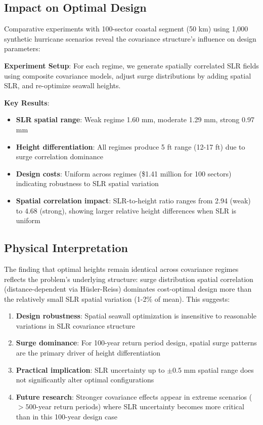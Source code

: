\documentclass[review]{elsarticle}
\begin{document}
\subsection{Impact on Optimal Design}

Comparative experiments with 100-sector coastal segment (50 km) using 1,000 synthetic hurricane scenarios reveal the covariance structure's influence on design parameters:

\textbf{Experiment Setup}:
For each regime, we generate spatially correlated SLR fields using composite covariance models, adjust surge distributions by adding spatial SLR, and re-optimize seawall heights.

\textbf{Key Results}:
\begin{itemize}
\item \textbf{SLR spatial range}: Weak regime 1.60 mm, moderate 1.29 mm, strong 0.97 mm
\item \textbf{Height differentiation}: All regimes produce 5 ft range (12-17 ft) due to surge correlation dominance
\item \textbf{Design costs}: Uniform across regimes (\$1.41 million for 100 sectors) indicating robustness to SLR spatial variation
\item \textbf{Spatial correlation impact}: SLR-to-height ratio ranges from 2.94 (weak) to 4.68 (strong), showing larger relative height differences when SLR is uniform
\end{itemize}

\subsection{Physical Interpretation}

The finding that optimal heights remain identical across covariance regimes reflects the problem's underlying structure: surge distribution spatial correlation (distance-dependent via Hüsler-Reiss) dominates cost-optimal design more than the relatively small SLR spatial variation (1-2\% of mean). This suggests:

\begin{enumerate}
\item \textbf{Design robustness}: Spatial seawall optimization is insensitive to reasonable variations in SLR covariance structure
\item \textbf{Surge dominance}: For 100-year return period design, spatial surge patterns are the primary driver of height differentiation
\item \textbf{Practical implication}: SLR uncertainty up to $\pm 0.5$ mm spatial range does not significantly alter optimal configurations
\item \textbf{Future research}: Stronger covariance effects appear in extreme scenarios ($>500$-year return periods) where SLR uncertainty becomes more critical than in this 100-year design case
\end{enumerate}
\end{document}
